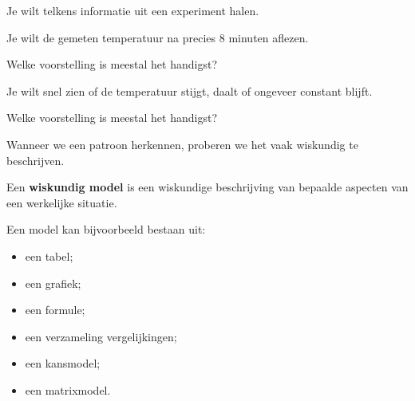 \documentclass{ximera}
\begin{document}
\begin{oefening}{\oefB}

Je wilt telkens informatie uit een experiment halen.

\begin{question}
Je wilt de gemeten temperatuur na precies $8$ minuten aflezen.

Welke voorstelling is meestal het handigst?

\begin{multipleChoice}
\end{multipleChoice}
\end{question}

\begin{question}
Je wilt snel zien of de temperatuur stijgt, daalt of ongeveer constant
blijft.

Welke voorstelling is meestal het handigst?

\begin{multipleChoice}
\end{multipleChoice}
\end{question}

\end{oefening}




Wanneer we een patroon herkennen, proberen we het vaak wiskundig te
beschrijven.

\begin{definitie}

Een \textbf{wiskundig model} is een wiskundige beschrijving van
bepaalde aspecten van een werkelijke situatie.

Een model kan bijvoorbeeld bestaan uit:

\begin{itemize}
  \item een tabel;
  \item een grafiek;
  \item een formule;
  \item een verzameling vergelijkingen;
  \item een kansmodel;
  \item een matrixmodel.
\end{itemize}

\end{definitie}
\end{document}
